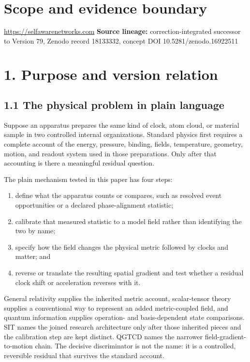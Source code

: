 \documentclass[
  american,
  11pt,
  letterpaper,
]{article}
\providecommand{\tightlist}{%
  \setlength{\itemsep}{0pt}\setlength{\parskip}{0pt}}
\begin{document}
\section{Scope and evidence boundary}\label{scope-and-evidence-boundary}

\url{https://selfawarenetworks.com} \textbf{Source lineage:} correction-integrated successor to Version 79, Zenodo record 18133332, concept DOI 10.5281/zenodo.16922511

\section{1. Purpose and version relation}\label{purpose-and-version-relation}

\subsection{1.1 The physical problem in plain language}\label{the-physical-problem-in-plain-language}

Suppose an apparatus prepares the same kind of clock, atom cloud, or material sample in two controlled internal organizations. Standard physics first requires a complete account of the energy, pressure, binding, fields, temperature, geometry, motion, and readout system used in those preparations. Only after that accounting is there a meaningful residual question.

The plain mechanism tested in this paper has four steps:

\begin{enumerate}
\def\labelenumi{\arabic{enumi}.}
\tightlist
\item
  define what the apparatus counts or compares, such as resolved event opportunities or a declared phase-alignment statistic;
\item
  calibrate that measured statistic to a model field rather than identifying the two by name;
\item
  specify how the field changes the physical metric followed by clocks and matter; and
\item
  reverse or translate the resulting spatial gradient and test whether a residual clock shift or acceleration reverses with it.
\end{enumerate}

General relativity supplies the inherited metric account, scalar-tensor theory supplies a conventional way to represent an added metric-coupled field, and quantum information supplies operation- and basis-dependent state comparisons. SIT names the joined research architecture only after those inherited pieces and the calibration step are kept distinct. QGTCD names the narrower field-gradient-to-motion chain. The decisive discriminator is not the name: it is a controlled, reversible residual that survives the standard account.
\end{document}

